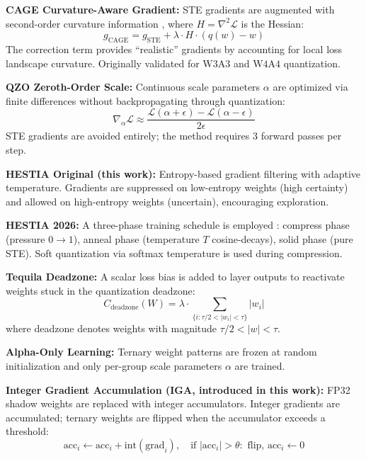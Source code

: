 \documentclass{article}
\begin{document}
\textbf{CAGE Curvature-Aware Gradient:} STE gradients are augmented with second-order curvature information \citep{cage2025}, where $H = \nabla^2 \mathcal{L}$ is the Hessian:
\begin{equation}
g_\text{CAGE} = g_\text{STE} + \lambda \cdot H \cdot (q(w) - w)
\end{equation}
The correction term provides ``realistic'' gradients by accounting for local loss landscape curvature. Originally validated for $\text{W3A3}$ and $\text{W4A4}$ quantization.

\textbf{QZO Zeroth-Order Scale:} Continuous scale parameters $\alpha$ are optimized via finite differences without backpropagating through quantization:
\begin{equation}
\nabla_\alpha \mathcal{L} \approx \frac{\mathcal{L}(\alpha + \epsilon) - \mathcal{L}(\alpha - \epsilon)}{2\epsilon}
\end{equation}
STE gradients are avoided entirely; the method requires 3 forward passes per step.

\textbf{HESTIA Original (this work):} Entropy-based gradient filtering with adaptive temperature. Gradients are suppressed on low-entropy weights (high certainty) and allowed on high-entropy weights (uncertain), encouraging exploration.

\textbf{HESTIA 2026:} A three-phase training schedule is employed \citep{hestia2026}: compress phase (pressure $0 \to 1$), anneal phase (temperature $T$ cosine-decays), solid phase (pure STE). Soft quantization via softmax temperature is used during compression.

\textbf{Tequila Deadzone:} A scalar loss bias is added to layer outputs to reactivate weights stuck in the quantization deadzone:
\begin{equation}
C_\text{deadzone}(W) = \lambda \cdot \sum_{\{i : \tau/2 < |w_i| < \tau\}} |w_i|
\end{equation}
where deadzone denotes weights with magnitude $\tau/2 < |w| < \tau$.

\textbf{Alpha-Only Learning:} Ternary weight patterns are frozen at random initialization and only per-group scale parameters $\alpha$ are trained.

\textbf{Integer Gradient Accumulation (IGA, introduced in this work):} FP32 shadow weights are replaced with integer accumulators. Integer gradients are accumulated; ternary weights are flipped when the accumulator exceeds a threshold:
\begin{equation}
\text{acc}_i \leftarrow \text{acc}_i + \text{int}(\text{grad}_i), \quad \text{if } |\text{acc}_i| > \theta: \text{ flip, } \text{acc}_i \leftarrow 0
\end{equation}
\end{document}
